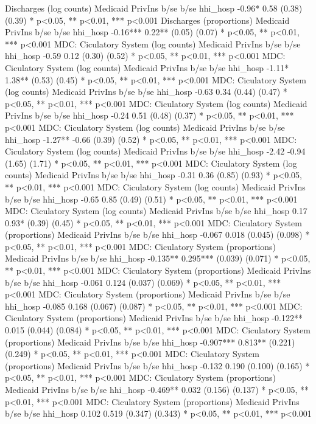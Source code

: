 Discharges (log counts)
	Medicaid	PrivIns
	b/se	b/se
hhi_hosp	-0.96*	0.58
	(0.38)	(0.39)
* p<0.05, ** p<0.01, *** p<0.001
Discharges (proportions)
	Medicaid	PrivIns
	b/se	b/se
hhi_hosp	-0.16***	0.22**
	(0.05)	(0.07)
* p<0.05, ** p<0.01, *** p<0.001
MDC: Ciculatory System (log counts)
	Medicaid	PrivIns
	b/se	b/se
hhi_hosp	-0.59	0.12
	(0.30)	(0.52)
* p<0.05, ** p<0.01, *** p<0.001
MDC: Ciculatory System (log counts)
	Medicaid	PrivIns
	b/se	b/se
hhi_hosp	-1.11*	1.38**
	(0.53)	(0.45)
* p<0.05, ** p<0.01, *** p<0.001
MDC: Ciculatory System (log counts)
	Medicaid	PrivIns
	b/se	b/se
hhi_hosp	-0.63	0.34
	(0.44)	(0.47)
* p<0.05, ** p<0.01, *** p<0.001
MDC: Ciculatory System (log counts)
	Medicaid	PrivIns
	b/se	b/se
hhi_hosp	-0.24	0.51
	(0.48)	(0.37)
* p<0.05, ** p<0.01, *** p<0.001
MDC: Ciculatory System (log counts)
	Medicaid	PrivIns
	b/se	b/se
hhi_hosp	-1.27**	-0.66
	(0.39)	(0.52)
* p<0.05, ** p<0.01, *** p<0.001
MDC: Ciculatory System (log counts)
	Medicaid	PrivIns
	b/se	b/se
hhi_hosp	-2.42	-0.94
	(1.65)	(1.71)
* p<0.05, ** p<0.01, *** p<0.001
MDC: Ciculatory System (log counts)
	Medicaid	PrivIns
	b/se	b/se
hhi_hosp	-0.31	0.36
	(0.85)	(0.93)
* p<0.05, ** p<0.01, *** p<0.001
MDC: Ciculatory System (log counts)
	Medicaid	PrivIns
	b/se	b/se
hhi_hosp	-0.65	0.85
	(0.49)	(0.51)
* p<0.05, ** p<0.01, *** p<0.001
MDC: Ciculatory System (log counts)
	Medicaid	PrivIns
	b/se	b/se
hhi_hosp	0.17	0.93*
	(0.39)	(0.45)
* p<0.05, ** p<0.01, *** p<0.001
MDC: Ciculatory System (proportions)
	Medicaid	PrivIns
	b/se	b/se
hhi_hosp	-0.067	0.018
	(0.045)	(0.098)
* p<0.05, ** p<0.01, *** p<0.001
MDC: Ciculatory System (proportions)
	Medicaid	PrivIns
	b/se	b/se
hhi_hosp	-0.135**	0.295***
	(0.039)	(0.071)
* p<0.05, ** p<0.01, *** p<0.001
MDC: Ciculatory System (proportions)
	Medicaid	PrivIns
	b/se	b/se
hhi_hosp	-0.061	0.124
	(0.037)	(0.069)
* p<0.05, ** p<0.01, *** p<0.001
MDC: Ciculatory System (proportions)
	Medicaid	PrivIns
	b/se	b/se
hhi_hosp	-0.085	0.168
	(0.067)	(0.087)
* p<0.05, ** p<0.01, *** p<0.001
MDC: Ciculatory System (proportions)
	Medicaid	PrivIns
	b/se	b/se
hhi_hosp	-0.122**	0.015
	(0.044)	(0.084)
* p<0.05, ** p<0.01, *** p<0.001
MDC: Ciculatory System (proportions)
	Medicaid	PrivIns
	b/se	b/se
hhi_hosp	-0.907***	0.813**
	(0.221)	(0.249)
* p<0.05, ** p<0.01, *** p<0.001
MDC: Ciculatory System (proportions)
	Medicaid	PrivIns
	b/se	b/se
hhi_hosp	-0.132	0.190
	(0.100)	(0.165)
* p<0.05, ** p<0.01, *** p<0.001
MDC: Ciculatory System (proportions)
	Medicaid	PrivIns
	b/se	b/se
hhi_hosp	-0.469**	0.032
	(0.156)	(0.137)
* p<0.05, ** p<0.01, *** p<0.001
MDC: Ciculatory System (proportions)
	Medicaid	PrivIns
	b/se	b/se
hhi_hosp	0.102	0.519
	(0.347)	(0.343)
* p<0.05, ** p<0.01, *** p<0.001
